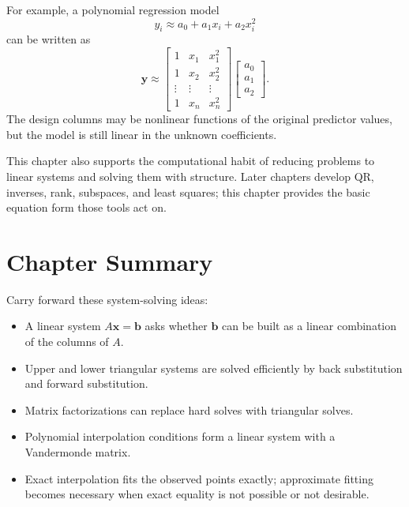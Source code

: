 For example, a polynomial regression model
\[
    y_i \approx a_0+a_1x_i+a_2x_i^2
\]
can be written as
\[
    \mathbf{y}\approx
    \begin{bmatrix}
        1 & x_1 & x_1^2\\
        1 & x_2 & x_2^2\\
        \vdots & \vdots & \vdots\\
        1 & x_n & x_n^2
    \end{bmatrix}
    \begin{bmatrix}
        a_0\\a_1\\a_2
    \end{bmatrix}.
\]
The design columns may be nonlinear functions of the original predictor values, but the model is still linear in the unknown coefficients.

This chapter also supports the computational habit of reducing problems to linear systems and solving them with structure. Later chapters develop QR, inverses, rank, subspaces, and least squares; this chapter provides the basic equation form those tools act on.

\section{Chapter Summary}
\label{mf:linear-systems-summary}
\label{mf:linear-systems-vandermonde-summary}

Carry forward these system-solving ideas:
\begin{itemize}
    \item A linear system \(A\mathbf{x}=\mathbf{b}\) asks whether \(\mathbf{b}\) can be built as a linear combination of the columns of \(A\).
    \item Upper and lower triangular systems are solved efficiently by back substitution and forward substitution.
    \item Matrix factorizations can replace hard solves with triangular solves.
    \item Polynomial interpolation conditions form a linear system with a Vandermonde matrix.
    \item Exact interpolation fits the observed points exactly; approximate fitting becomes necessary when exact equality is not possible or not desirable.
\end{itemize}
